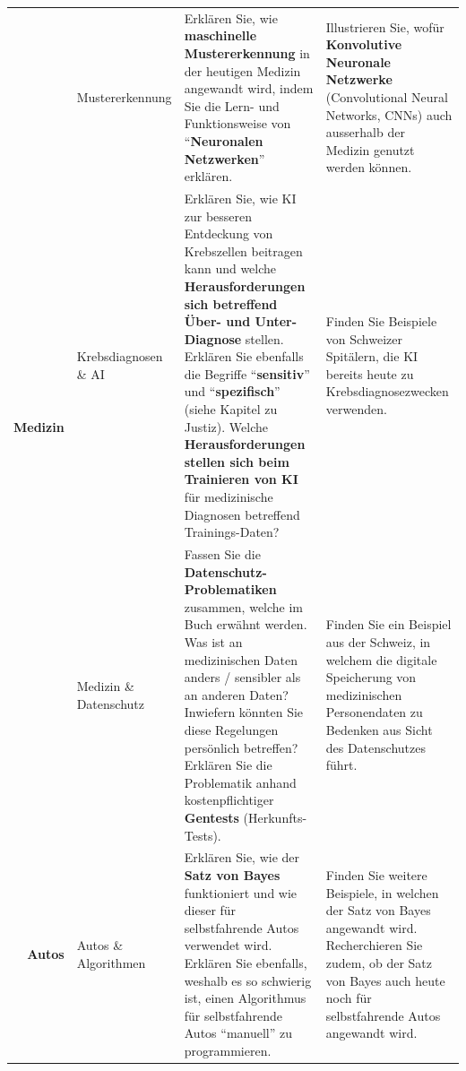 \begin{landscape}
\begin{longtable}{@{}rp{5.3cm}p{9.5cm}p{9.5cm}@{}}
		\multirow{3}{*}{\textbf{Medizin}}      & Mustererkennung                       & Erklären Sie, wie \textbf{maschinelle Mustererkennung} in der heutigen Medizin angewandt wird, indem Sie die Lern- und Funktionsweise von \enquote{\textbf{Neuronalen Netzwerken}} erklären.                                                                                                                                                                                                         & Illustrieren Sie, wofür \textbf{Konvolutive Neuronale Netzwerke} (Convolutional Neural Networks, CNNs) auch ausserhalb der Medizin genutzt werden können.                                                                                                                                 \\\cmidrule(l){2-4}
		                              & Krebsdiagnosen \& AI                  & Erklären Sie, wie KI zur besseren Entdeckung von Krebszellen beitragen kann und welche \textbf{Herausforderungen sich betreffend Über- und Unter-Diagnose} stellen. Erklären Sie ebenfalls die Begriffe \enquote{\textbf{sensitiv}} und \enquote{\textbf{spezifisch}} (siehe Kapitel zu Justiz). Welche \textbf{Herausforderungen stellen sich beim Trainieren von KI} für medizinische Diagnosen betreffend Trainings-Daten? & Finden Sie Beispiele von Schweizer Spitälern, die KI bereits heute zu Krebsdiagnosezwecken verwenden.                                                                                                                                                                            \\\cmidrule(l){2-4}
		                              & Medizin \& Datenschutz                & Fassen Sie die \textbf{Datenschutz-Problematiken} zusammen, welche im Buch erwähnt werden. Was ist an medizinischen Daten anders / sensibler als an anderen Daten? Inwiefern könnten Sie diese Regelungen persönlich betreffen? Erklären Sie die Problematik anhand kostenpflichtiger \textbf{Gentests} (Herkunfts-Tests).                                                                   & Finden Sie ein Beispiel aus der Schweiz, in welchem die digitale Speicherung von medizinischen Personendaten zu Bedenken aus Sicht des Datenschutzes führt.                                                                                                                        \\\midrule
		\multirow{2}{*}{\textbf{Autos}}        & Autos \& Algorithmen                  & Erklären Sie, wie der \textbf{Satz von Bayes} funktioniert und wie dieser für selbstfahrende Autos verwendet wird. Erklären Sie ebenfalls, weshalb es so schwierig ist, einen Algorithmus für selbstfahrende Autos \enquote{manuell} zu programmieren.                                                                                                                              & Finden Sie weitere Beispiele, in welchen der Satz von Bayes angewandt wird. Recherchieren Sie zudem, ob der Satz von Bayes auch heute noch für selbstfahrende Autos angewandt wird.                                                                                                                        \\\cmidrule(l){2-4}

\end{longtable}
\end{landscape}
